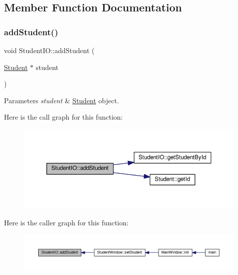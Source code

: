 \subsection{Member Function Documentation}
\mbox{\label{class_student_i_o_a5910dacfbf2593ff3cfddc242e3e114b}} 
\subsubsection{\texorpdfstring{add\+Student()}{addStudent()}}
{\footnotesize\ttfamily void Student\+I\+O\+::add\+Student (\begin{DoxyParamCaption}\item[{\hyperlink{class_student}{Student} $\ast$}]{student }\end{DoxyParamCaption})}


\begin{DoxyParams}{Parameters}
{\em student} & \hyperlink{class_student}{Student} object. \\
\hline
\end{DoxyParams}
Here is the call graph for this function\+:
\nopagebreak
\begin{figure}[H]
\begin{center}
\leavevmode
\includegraphics[width=350pt]{class_student_i_o_a5910dacfbf2593ff3cfddc242e3e114b_cgraph}
\end{center}
\end{figure}
Here is the caller graph for this function\+:
\nopagebreak
\begin{figure}[H]
\begin{center}
\leavevmode
\includegraphics[width=350pt]{class_student_i_o_a5910dacfbf2593ff3cfddc242e3e114b_icgraph}
\end{center}
\end{figure}
\mbox{\label{class_student_i_o_a513138a007310d8c123ba04ce1af8e4e}} 
